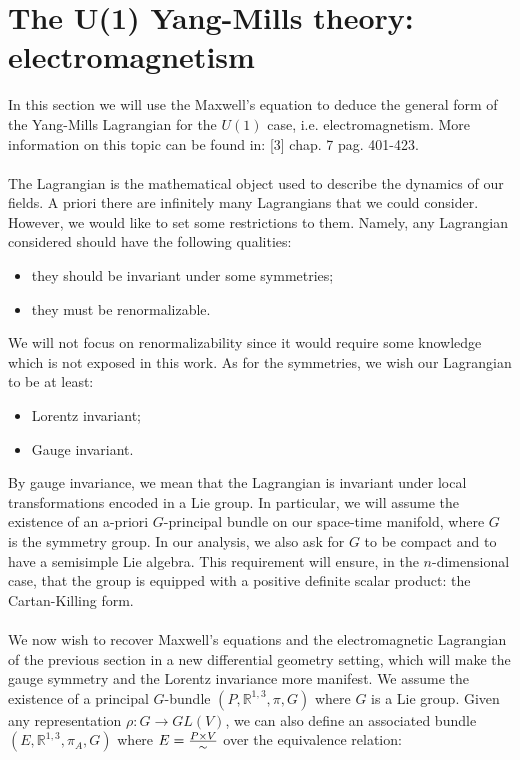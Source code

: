 \documentclass[12pt,a4paper]{report}
\theoremstyle{definition}
\theoremstyle{Theorem}
\theoremstyle{definition}
\theoremstyle{definition}
\begin{document}
	\section{The U(1) Yang-Mills theory: electromagnetism}
	In this section we will use the Maxwell's equation to deduce the general form of the Yang-Mills Lagrangian for the $U(1)$ case, i.e. electromagnetism. More information on this topic can be found in: [3] chap. 7 pag. 401-423.
	\\\\
	The Lagrangian is the mathematical object used to describe the dynamics of our fields. A priori there are infinitely many Lagrangians that we could consider. However, we would like to set some restrictions to them. Namely, any Lagrangian considered should have the following qualities:
	\begin{itemize}
		\item they should be invariant under some symmetries;
		\item they must be renormalizable.
	\end{itemize}
	We will not focus on renormalizability since it would require some knowledge which is not exposed in this work. As for the symmetries, we wish our Lagrangian to be at least:
	\begin{itemize}
		\item Lorentz invariant;
		\item Gauge invariant.
	\end{itemize}
	By gauge invariance, we mean that the Lagrangian is invariant under local transformations encoded in a Lie group. In particular, we will assume the existence of an a-priori $G$-principal bundle on our space-time manifold, where $G$ is the symmetry group. In our analysis, we also ask for $G$ to be compact and to have a semisimple Lie algebra. This requirement will ensure, in the $n$-dimensional case, that the group is equipped with a positive definite scalar product: the Cartan-Killing form.
	\\\\
	We now wish to recover Maxwell's equations and the electromagnetic Lagrangian of the previous section in a new differential geometry setting, which will make the gauge symmetry and the Lorentz invariance more manifest. We assume the existence of a principal $G$-bundle $(P,\mathbb{R}^{1,3},\pi,G)$ where $G$ is a Lie group. Given any representation $\rho:G\rightarrow GL(V)$, we can also define an associated bundle $(E,\mathbb{R}^{1,3},\pi_A,G)$ where $E={P\times V\over \sim}$ over the equivalence relation:
\end{document}
